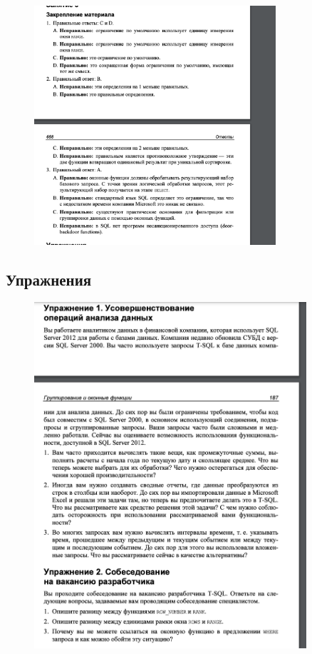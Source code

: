 \begin{figure}[h!]
	\begin{center}
		\includegraphics[width=0.8\textwidth]{img/ans13.png}
	\end{center}
	\captionsetup{justification=centering}
\end{figure}



\newpage
\subsection*{Упражнения}

\begin{figure}[h!]
	\begin{center}
		\includegraphics[width=0.9\textwidth]{img/ex13.png}
	\end{center}
	\captionsetup{justification=centering}
\end{figure}

